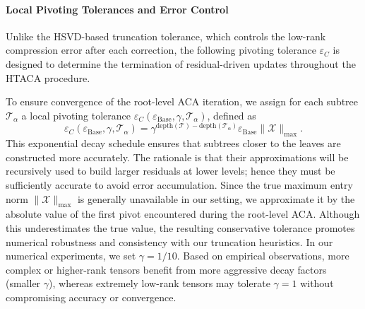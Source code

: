 \documentclass{article}
\theoremstyle{plain}
\theoremstyle{definition}
\theoremstyle{remark}
\begin{document}
\paragraph{Local Pivoting Tolerances and Error Control}
Unlike the HSVD-based truncation tolerance, which controls the low-rank compression error after each correction, the following pivoting tolerance \(\varepsilon_C\) is designed to determine the termination of residual-driven updates throughout the HTACA procedure.

To ensure convergence of the root-level ACA iteration, we assign for each subtree \(\mathcal{T}_\alpha\) a local pivoting tolerance \(\varepsilon_C(\varepsilon_{\text{Base}}, \gamma, \mathcal{T}_\alpha)\), defined as
\begin{equation}\label{eq:hierach_pivoting}
\varepsilon_C(\varepsilon_{\text{Base}}, \gamma, \mathcal{T}_\alpha) = \gamma^{\text{depth}(\mathcal{T}) - \text{depth}(\mathcal{T}_{\alpha})}\varepsilon_{\text{Base}}\|\mathcal{X}\|_{\max}.
\end{equation}
This exponential decay schedule ensures that subtrees closer to the leaves are constructed more accurately. The rationale is that their approximations will be recursively used to build larger residuals at lower levels; hence they must be sufficiently accurate to avoid error accumulation. Since the true maximum entry norm \(\|\mathcal{X}\|_{\max}\) is generally unavailable in our setting, we approximate it by the absolute value of the first pivot encountered during the root-level ACA. Although this underestimates the true value, the resulting conservative tolerance promotes numerical robustness and consistency with our truncation heuristics. In our numerical experiments, we set \(\gamma = 1/10\). Based on empirical observations, more complex or higher-rank tensors benefit from more aggressive decay factors (smaller \(\gamma\)), whereas extremely low-rank tensors may tolerate \(\gamma = 1\) without compromising accuracy or convergence.
\end{document}
